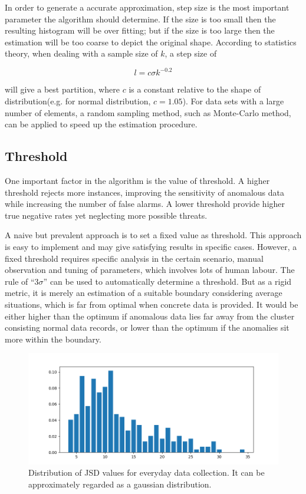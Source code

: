 \documentclass[a4paper]{IEEEtran}
\begin{document}
			In order to generate a accurate approximation, step size is the most important parameter the algorithm should determine. If the size is too small then the resulting histogram will be over fitting; but if the size is too large then the estimation will be too coarse to depict the original shape. According to statistics theory, when dealing with a sample size of $k$, a step size of 
			
			\begin{equation}\label{equ:step-size}
				l = c \sigma k^{-0.2}
			\end{equation}
			
			will give a best partition, where $c$ is a constant relative to the shape of distribution(e.g. for normal distribution, $c=1.05$). For data sets with a large number of elements, a random sampling method, such as Monte-Carlo method, can be applied to speed up the estimation procedure.
			
		\subsection{Threshold}\label{sec:alg-threshold}
			One important factor in the algorithm is the value of threshold. A higher threshold rejects more instances, improving the sensitivity of anomalous data while increasing the number of false alarms. A lower threshold provide higher true negative rates yet neglecting more possible threats.
			
			A naive but prevalent approach is to set a fixed value as threshold. This approach is easy to implement and may give satisfying results in specific cases. However, a fixed threshold requires specific analysis in the certain scenario, manual observation and tuning of parameters, which involves lots of human labour. The rule of ``$3 \sigma$'' can be used to automatically determine a threshold. But as a rigid metric, it is merely an estimation of a suitable boundary considering average situations, which is far from optimal when concrete data is provided. It would be either higher than the optimum if anomalous data lies far away from the cluster consisting normal data records, or lower than the optimum if the anomalies sit more within the boundary.
			
			\begin{figure}[!t]
				\centering
				\includegraphics[width=\linewidth]{fig/JSD-Dist.png}
				\caption{Distribution of JSD values for everyday data collection. It can be approximately regarded as a gaussian distribution.}
			\end{figure}
			
\end{document}
